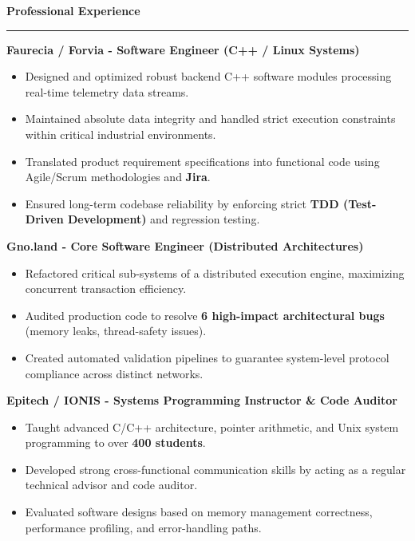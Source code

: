 \documentclass[9pt]{extarticle}
\begin{document}
\par\vspace{5pt}

{\large\bfseries Professional Experience}
\par\vspace{-8pt}
\rule{\linewidth}{0.4pt}
\par\vspace{5pt}

{\bfseries Faurecia / Forvia - Software Engineer (C++ / Linux Systems)}
\begin{itemize}[noitemsep, topsep=0pt]
    \item Designed and optimized robust backend C++ software modules processing real-time telemetry data streams.
    \item Maintained absolute data integrity and handled strict execution constraints within critical industrial environments.
    \item Translated product requirement specifications into functional code using Agile/Scrum methodologies and {\bfseries Jira}.
    \item Ensured long-term codebase reliability by enforcing strict {\bfseries TDD (Test-Driven Development)} and regression testing.
\end{itemize}

\par\vspace{5pt}

{\bfseries Gno.land - Core Software Engineer (Distributed Architectures)}
\begin{itemize}[noitemsep, topsep=0pt]
    \item Refactored critical sub-systems of a distributed execution engine, maximizing concurrent transaction efficiency.
    \item Audited production code to resolve {\bfseries 6 high-impact architectural bugs} (memory leaks, thread-safety issues).
    \item Created automated validation pipelines to guarantee system-level protocol compliance across distinct networks.
\end{itemize}

\par\vspace{5pt}

{\bfseries Epitech / IONIS - Systems Programming Instructor \& Code Auditor}
\begin{itemize}[noitemsep, topsep=0pt]
    \item Taught advanced C/C++ architecture, pointer arithmetic, and Unix system programming to over {\bfseries 400 students}.
    \item Developed strong cross-functional communication skills by acting as a regular technical advisor and code auditor.
    \item Evaluated software designs based on memory management correctness, performance profiling, and error-handling paths.
\end{itemize}
\end{document}
